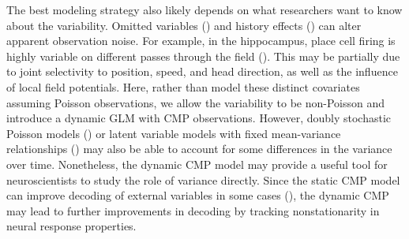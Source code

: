 \documentclass[aoas]{imsart}
\theoremstyle{plain}
\theoremstyle{remark}
\begin{document}
The best modeling strategy also likely depends on what researchers want to know about the variability. Omitted variables (\cite{Stevenson2018,Goris2014}) and history effects (\cite{Uzzell2004}) can alter apparent observation noise. For example, in the hippocampus, place cell firing is highly variable on different passes through the field (\cite{Fenton1998}). This may be partially due to joint selectivity to position, speed, and head direction, as well as the influence of local field potentials. Here, rather than model these distinct covariates assuming Poisson observations, we allow the variability to be non-Poisson and introduce a dynamic GLM with CMP observations. However, doubly stochastic Poisson models (\cite{Barbieri2001}) or latent variable models with fixed mean-variance relationships (\cite{Gao2015,Pillow2012}) may also be able to account for some differences in the variance over time. Nonetheless, the dynamic CMP model may provide a useful tool for neuroscientists to study the role of variance directly. Since the static CMP model can improve decoding of external variables in some cases (\cite{Ghanbari2019}), the dynamic CMP may lead to further improvements in decoding by tracking nonstationarity in neural response properties. 

\end{document}
